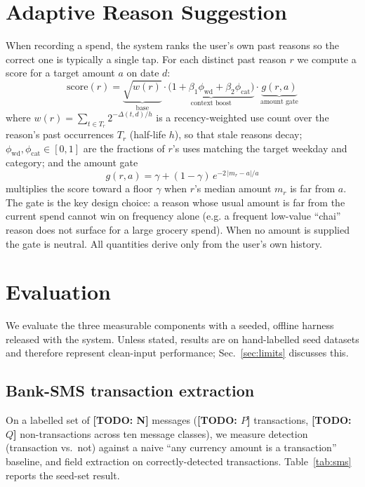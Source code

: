 \documentclass[conference]{IEEEtran}
\newcommand{\todo}[1]{{\color{red}\textbf{[TODO: #1]}}}
\begin{document}
\section{Adaptive Reason Suggestion}
\label{sec:reasons}
When recording a spend, the system ranks the user's own past reasons so the
correct one is typically a single tap. For each distinct past reason $r$ we
compute a score for a target amount $a$ on date $d$:
\begin{equation}
\mathrm{score}(r) = \underbrace{\sqrt{w(r)}}_{\text{base}} \cdot
\underbrace{\big(1 + \beta_1 \phi_{\mathrm{wd}} + \beta_2 \phi_{\mathrm{cat}}\big)}_{\text{context boost}} \cdot
\underbrace{g(r, a)}_{\text{amount gate}}
\end{equation}
where $w(r) = \sum_{t \in T_r} 2^{-\Delta(t,d)/h}$ is a recency-weighted use
count over the reason's past occurrences $T_r$ (half-life $h$), so that stale
reasons decay; $\phi_{\mathrm{wd}}, \phi_{\mathrm{cat}} \in [0,1]$ are the
fractions of $r$'s uses matching the target weekday and category; and the
amount gate
\begin{equation}
g(r,a) = \gamma + (1-\gamma)\, e^{-2\,|{m_r - a}|/a}
\end{equation}
multiplies the score toward a floor $\gamma$ when $r$'s median amount $m_r$ is
far from $a$. The gate is the key design choice: a reason whose usual amount is
far from the current spend cannot win on frequency alone (e.g. a frequent
low-value ``chai'' reason does not surface for a large grocery spend). When no
amount is supplied the gate is neutral. All quantities derive only from the
user's own history.

\section{Evaluation}
\label{sec:eval}
We evaluate the three measurable components with a seeded, offline harness
released with the system. Unless stated, results are on hand-labelled seed
datasets and therefore represent clean-input performance; Sec.~\ref{sec:limits}
discusses this.

\subsection{Bank-SMS transaction extraction}
On a labelled set of \todo{N} messages (\todo{$P$} transactions, \todo{$Q$}
non-transactions across ten message classes), we measure detection
(transaction vs.\ not) against a naive ``any currency amount is a transaction''
baseline, and field extraction on correctly-detected transactions.
Table~\ref{tab:sms} reports the seed-set result.
\end{document}
